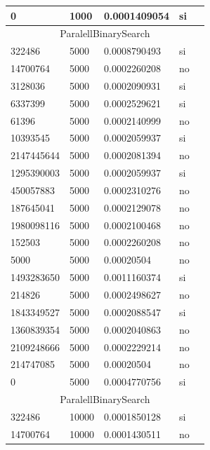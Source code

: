 \documentclass[12pt, fleqn]{article}                             %
\theoremstyle{break}                                            %
\begin{document}
\begin{longtable}{|m{5em}|m{5em}|m{10em}|m{5em}|@{}m{0pt}@{}}
            0& 1000  & 0.0001409054 & si &\\[1em]    \hline
            \multicolumn{5}{|c|}{ParalellBinarySearch}   \\          \hline
            322486& 5000  & 0.0008790493 & si &\\[1em]    \hline
            14700764& 5000  & 0.0002260208 & no &\\[1em]    \hline
            3128036& 5000  & 0.0002090931 & si &\\[1em]    \hline
            6337399& 5000  & 0.0002529621 & si &\\[1em]    \hline
            61396& 5000  & 0.0002140999 & no &\\[1em]    \hline
            10393545& 5000  & 0.0002059937 & si &\\[1em]    \hline
            2147445644& 5000  & 0.0002081394 & no &\\[1em]    \hline
            1295390003& 5000  & 0.0002059937 & si &\\[1em]    \hline
            450057883& 5000  & 0.0002310276 & no &\\[1em]    \hline
            187645041& 5000  & 0.0002129078 & no &\\[1em]    \hline
            1980098116& 5000  & 0.0002100468 & no &\\[1em]    \hline
            152503& 5000  & 0.0002260208 & no &\\[1em]    \hline
            5000& 5000  & 0.00020504 & no &\\[1em]    \hline
            1493283650& 5000  & 0.0011160374 & si &\\[1em]    \hline
            214826& 5000  & 0.0002498627 & no &\\[1em]    \hline
            1843349527& 5000  & 0.0002088547 & si &\\[1em]    \hline
            1360839354& 5000  & 0.0002040863 & no &\\[1em]    \hline
            2109248666& 5000  & 0.0002229214 & no &\\[1em]    \hline
            214747085& 5000  & 0.00020504 & no &\\[1em]    \hline
            0& 5000  & 0.0004770756 & si &\\[1em]    \hline
            \multicolumn{5}{|c|}{ParalellBinarySearch}   \\          \hline
            322486& 10000  & 0.0001850128 & si &\\[1em]    \hline
            14700764& 10000  & 0.0001430511 & no &\\[1em]    \hline

\end{longtable}
\end{document}

